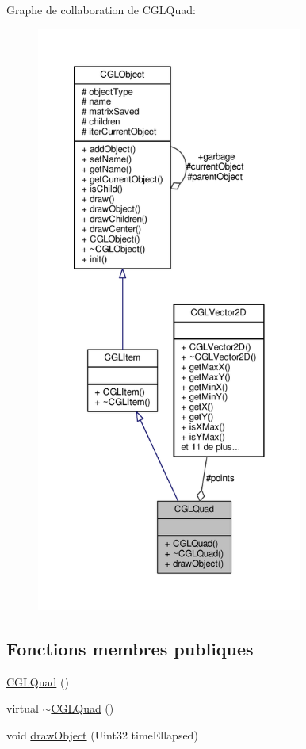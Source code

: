 Graphe de collaboration de C\-G\-L\-Quad\-:
\nopagebreak
\begin{figure}[H]
\begin{center}
\leavevmode
\includegraphics[height=550pt]{dd/d46/class_c_g_l_quad__coll__graph}
\end{center}
\end{figure}
\subsection*{Fonctions membres publiques}
\begin{DoxyCompactItemize}
\item 
\hyperlink{class_c_g_l_quad_a95b07c1605f65de30cb47b65fa364294}{C\-G\-L\-Quad} ()
\item 
virtual \hyperlink{class_c_g_l_quad_a19320cf64816de2de1fa7540acbf833e}{$\sim$\-C\-G\-L\-Quad} ()
\item 
void \hyperlink{class_c_g_l_quad_a81696d558e2355af7d621cdbf0ccf41a}{draw\-Object} (Uint32 time\-Ellapsed)
\end{DoxyCompactItemize}
